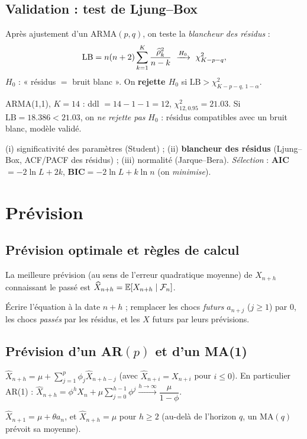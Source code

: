 \documentclass[11pt]{report}
\begin{document}
\section{Validation : test de Ljung--Box}
\begin{definition}
Après ajustement d'un ARMA$(p,q)$, on teste la \emph{blancheur des résidus} :
\[
\mathrm{LB}=n(n+2)\sum_{k=1}^{K}\frac{\rhohat_k^2}{n-k}\ \xrightarrow{H_0}\ \chi^2_{K-p-q},
\]
$H_0$ : « résidus $=$ bruit blanc ». On \textbf{rejette $H_0$} si
$\mathrm{LB}>\chi^2_{K-p-q,\,1-\alpha}$.
\end{definition}
\begin{exemple}[$\to$ Q\,J.21]
ARMA(1,1), $K=14$ : ddl $=14-1-1=12$, $\chi^2_{12,0.95}=21.03$. Si $\mathrm{LB}=18.386<21.03$,
on \emph{ne rejette pas} $H_0$ : résidus compatibles avec un bruit blanc, modèle validé.
\end{exemple}
\begin{recette}
(i) significativité des paramètres (Student) ; (ii) \textbf{blancheur des résidus}
(Ljung--Box, ACF/PACF des résidus) ; (iii) normalité (Jarque--Bera). \emph{Sélection} :
\textbf{AIC}$=-2\ln L+2k$, \textbf{BIC}$=-2\ln L+k\ln n$ (on \emph{minimise}).
\end{recette}

\chapter{Prévision}

\section{Prévision optimale et règles de calcul}
\begin{definition}
La meilleure prévision (au sens de l'erreur quadratique moyenne) de $X_{n+h}$ connaissant le
passé est $\widehat X_{n+h}=\mathbb{E}[X_{n+h}\mid\mathcal F_n]$.
\end{definition}
\begin{methode}[Calcul]
Écrire l'équation à la date $n+h$ ; remplacer les chocs \emph{futurs} $a_{n+j}$ ($j\ge1$)
par $0$, les chocs \emph{passés} par les résidus, et les $X$ futurs par leurs prévisions.
\end{methode}

\section{Prévision d'un AR$(p)$ et d'un MA(1)}
\begin{theoreme}[AR$(p)$]
$\widehat X_{n+h}=\mu+\sum_{j=1}^p\phi_j\widehat X_{n+h-j}$ (avec $\widehat X_{n+i}=X_{n+i}$
pour $i\le0$). En particulier AR(1) :
$\widehat X_{n+h}=\phi^hX_n+\mu\sum_{j=0}^{h-1}\phi^j\xrightarrow{h\to\infty}\dfrac{\mu}{1-\phi}$.
\end{theoreme}
\begin{theoreme}[MA(1)]
$\widehat X_{n+1}=\mu+\theta a_n$, et $\widehat X_{n+h}=\mu$ pour $h\ge2$ (au-delà de
l'horizon $q$, un MA$(q)$ prévoit sa moyenne).
\end{theoreme}
\end{document}
